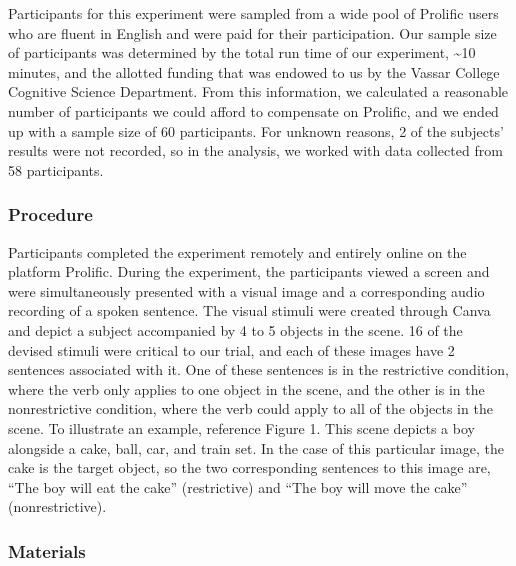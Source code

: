 \documentclass[
  english,
  man]{apa6}
\begin{document}
Participants for this experiment were sampled from a wide pool of Prolific users who are fluent in English and were paid for their participation. Our sample size of participants was determined by the total run time of our experiment, \textasciitilde10 minutes, and the allotted funding that was endowed to us by the Vassar College Cognitive Science Department. From this information, we calculated a reasonable number of participants we could afford to compensate on Prolific, and we ended up with a sample size of 60 participants. For unknown reasons, 2 of the subjects' results were not recorded, so in the analysis, we worked with data collected from 58 participants.

\hypertarget{procedure}{%
\subsubsection{Procedure}\label{procedure}}

Participants completed the experiment remotely and entirely online on the platform Prolific. During the experiment, the participants viewed a screen and were simultaneously presented with a visual image and a corresponding audio recording of a spoken sentence. The visual stimuli were created through Canva and depict a subject accompanied by 4 to 5 objects in the scene. 16 of the devised stimuli were critical to our trial, and each of these images have 2 sentences associated with it. One of these sentences is in the restrictive condition, where the verb only applies to one object in the scene, and the other is in the nonrestrictive condition, where the verb could apply to all of the objects in the scene. To illustrate an example, reference Figure 1. This scene depicts a boy alongside a cake, ball, car, and train set. In the case of this particular image, the cake is the target object, so the two corresponding sentences to this image are, ``The boy will eat the cake'' (restrictive) and ``The boy will move the cake'' (nonrestrictive).

\hypertarget{materials}{%
\subsubsection{Materials}\label{materials}}
\end{document}
